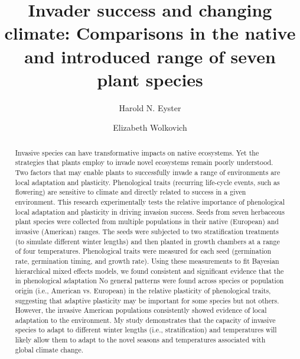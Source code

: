 \documentclass[12pt]{article}\usepackage[]{graphicx}\usepackage[]{color}
\title{Invader success and changing climate: Comparisons in the native and introduced range of seven plant species}
\author[1]{Harold N. Eyster}
\author[2]{Elizabeth Wolkovich}
\affil[1]{Institute for Resources, Environment, and Sustainability, University of British Columbia}
\affil[2]{Department of Forest and Conservation Science, University of British Columbia}
\date{}                     %
\begin{document}
\maketitle

\begin{spacing}{1} %
	\begin{abstract}
		Invasive species can have transformative impacts on native ecosystems. Yet the strategies that plants employ to invade novel ecosystems remain poorly understood.  Two factors that may enable plants to successfully invade a range of environments are local adaptation and plasticity. Phenological traits (recurring life-cycle events, such as flowering) are sensitive to climate and directly related to success in a given environment. This research experimentally tests the relative importance of phenological local adaptation and plasticity in driving invasion success. Seeds from seven herbaceous plant species were collected from multiple populations in their native (European) and invasive (American) ranges. The seeds were subjected to two stratification treatments (to simulate different winter lengths) and then planted in growth chambers at a range of  four temperatures. Phenological traits were measured for each seed (germination rate, germination timing, and growth rate). Using these measurements to  fit Bayesian hierarchical mixed effects models, we found consistent and significant evidence that the in phenological adaptation  No general patterns were found across species or population origin (i.e., American vs. European) in the relative plasticity of phenological traits, suggesting that adaptive plasticity may be important for some species but not others. However, the invasive American populations consistently showed evidence of local adaptation to the environment. My study demonstrates that the capacity of invasive species to adapt to different winter lengths (i.e., stratification) and temperatures will likely allow them to adapt to the novel seasons and temperatures associated with global climate change.  
	\end{abstract}
\end{spacing}		
\end{document}
